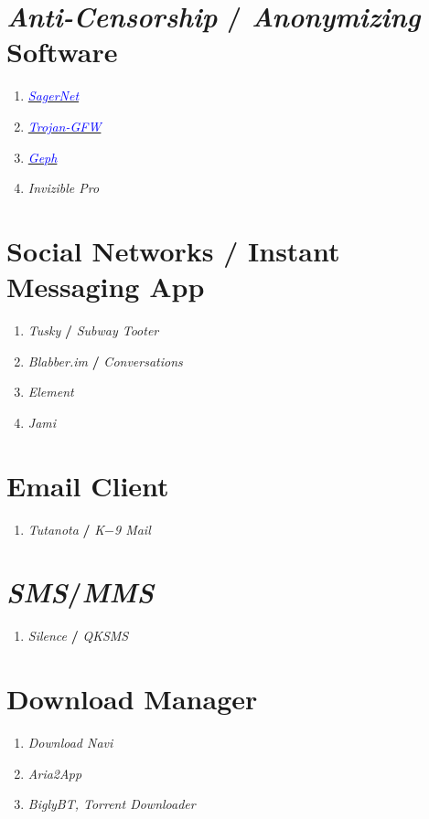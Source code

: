 \documentclass[12pt , a4paper]{article}
\begin{document}
\section{\emph{Anti-Censorship} / \emph{Anonymizing} Software}
\begin{enumerate}
	\item \href{https://github.com/SagerNet/SagerNet}{\textcolor{blue}{\emph{SagerNet}}}
	\item \href{https://github.com/trojan-gfw/}{\textcolor{blue}{\textit{Trojan-GFW}}}
	\item \href{https://geph.io/en/}{\textcolor{blue}{\emph{Geph}}}
	\item \emph{Invizible Pro}
\end{enumerate}

\section{Social Networks \textbf{/} Instant Messaging App}
\begin{enumerate}
	\item \emph{Tusky} \textbf{/} \emph{Subway Tooter}
	\item \emph{Blabber.im} \textbf{/} \emph{Conversations}
	\item \emph{Element}
	\item \emph{Jami}
\end{enumerate}

\section{Email Client}
\begin{enumerate}
	\item[] \emph{Tutanota} \textbf{/} \emph{K$-$9 Mail}
\end{enumerate}

\section{\emph{SMS}/\emph{MMS}}
\begin{enumerate}
	\item[] \emph{Silence} \textbf{/} \emph{QKSMS}
\end{enumerate}

\section{Download Manager}
\begin{enumerate}
	\item \emph{Download Navi}
	\item \emph{Aria2App}
	\item \emph{BiglyBT, Torrent Downloader }
\end{enumerate}
\end{document}

